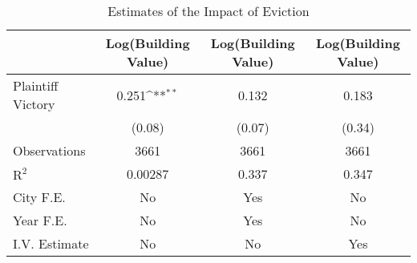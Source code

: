 \begin{table}[htbp]\centering
\def\sym#1{\ifmmode^{#1}\else\(^{#1}\)\fi}
\caption{Estimates of the Impact of Eviction}
\begin{tabular}{l*{3}{c}}
\toprule
                    &\multicolumn{1}{c}{Log(Building Value)}&\multicolumn{1}{c}{Log(Building Value)}&\multicolumn{1}{c}{Log(Building Value)}\\
\midrule
Plaintiff Victory   &       0.251\sym{**} &       0.132         &       0.183         \\
                    &      (0.08)         &      (0.07)         &      (0.34)         \\
\midrule
Observations        &        3661         &        3661         &        3661         \\
$\text{R}^2$        &     0.00287         &       0.337         &       0.347         \\
City F.E.           &          No         &         Yes         &          No         \\
Year F.E.           &          No         &         Yes         &          No         \\
I.V. Estimate       &          No         &          No         &         Yes         \\
\bottomrule
\end{tabular}
\end{table}
